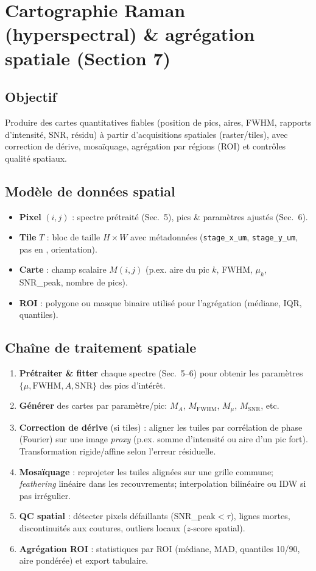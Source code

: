 
\section{Cartographie Raman (hyperspectral) \& agrégation spatiale (Section 7)}

\subsection{Objectif}
Produire des cartes quantitatives fiables (position de pics, aires, FWHM, rapports d'intensité, SNR, résidu) à partir d'acquisitions spatiales (raster/tiles), avec correction de dérive, mosaïquage, agrégation par régions (ROI) et contrôles qualité spatiaux.

\subsection{Modèle de données spatial}
\begin{itemize}[nosep]
\item \textbf{Pixel} $(i,j)$ : spectre prétraité (Sec.~5), pics \& paramètres ajustés (Sec.~6).
\item \textbf{Tile} $T$ : bloc de taille $H\times W$ avec métadonnées (\texttt{stage\_x\_um}, \texttt{stage\_y\_um}, pas en \um, orientation).
\item \textbf{Carte} : champ scalaire $M(i,j)$ (p.ex. aire du pic $k$, FWHM, $\mu_k$, SNR\_peak, nombre de pics).
\item \textbf{ROI} : polygone ou masque binaire utilisé pour l'agrégation (médiane, IQR, quantiles).
\end{itemize}

\subsection{Chaîne de traitement spatiale}
\begin{enumerate}[nosep]
\item \textbf{Prétraiter \& fitter} chaque spectre (Sec.~5--6) pour obtenir les paramètres $\{\mu, \mathrm{FWHM}, A, \mathrm{SNR}\}$ des pics d'intérêt.
\item \textbf{Générer} des cartes par paramètre/pic: $M_A$, $M_{\mathrm{FWHM}}$, $M_{\mu}$, $M_{\mathrm{SNR}}$, etc.
\item \textbf{Correction de dérive} (si tiles) : aligner les tuiles par corrélation de phase (Fourier) sur une image \emph{proxy} (p.ex. somme d'intensité ou aire d'un pic fort). Transformation rigide/affine selon l'erreur résiduelle.
\item \textbf{Mosaïquage} : reprojeter les tuiles alignées sur une grille commune; \emph{feathering} linéaire dans les recouvrements; interpolation bilinéaire ou IDW si pas irrégulier.
\item \textbf{QC spatial} : détecter pixels défaillants (SNR\_peak$<\tau$), lignes mortes, discontinuités aux coutures, outliers locaux ($z$-score spatial).
\item \textbf{Agrégation ROI} : statistiques par ROI (médiane, MAD, quantiles 10/90, aire pondérée) et export tabulaire.
\end{enumerate}

